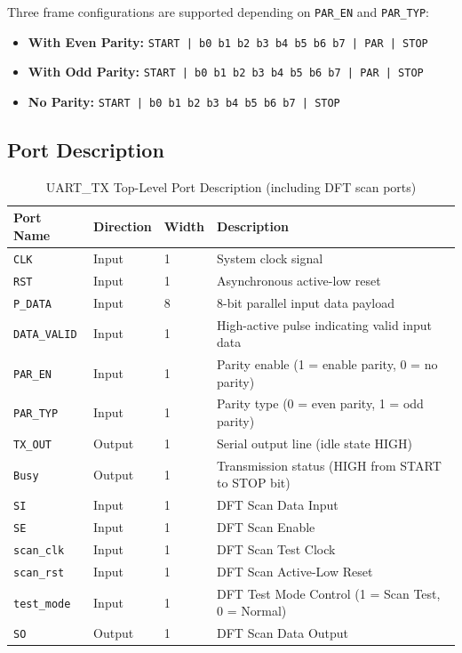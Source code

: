 \documentclass[12pt,a4paper]{article}
\begin{document}
Three frame configurations are supported depending on \texttt{PAR\_EN} and \texttt{PAR\_TYP}:
\begin{itemize}
  \item \textbf{With Even Parity:} \texttt{START | b0 b1 b2 b3 b4 b5 b6 b7 | PAR | STOP}
  \item \textbf{With Odd Parity:}  \texttt{START | b0 b1 b2 b3 b4 b5 b6 b7 | PAR | STOP}
  \item \textbf{No Parity:}        \texttt{START | b0 b1 b2 b3 b4 b5 b6 b7 | STOP}
\end{itemize}

\subsection{Port Description}

\begin{table}[H]
\centering
\small
\begin{tabular}{llll}
\toprule
\textbf{Port Name} & \textbf{Direction} & \textbf{Width} & \textbf{Description} \\
\midrule
\texttt{CLK}        & Input  & 1 & System clock signal \\
\texttt{RST}        & Input  & 1 & Asynchronous active-low reset \\
\texttt{P\_DATA}    & Input  & 8 & 8-bit parallel input data payload \\
\texttt{DATA\_VALID}& Input  & 1 & High-active pulse indicating valid input data \\
\texttt{PAR\_EN}    & Input  & 1 & Parity enable (1 = enable parity, 0 = no parity) \\
\texttt{PAR\_TYP}   & Input  & 1 & Parity type (0 = even parity, 1 = odd parity) \\
\texttt{TX\_OUT}    & Output & 1 & Serial output line (idle state HIGH) \\
\texttt{Busy}       & Output & 1 & Transmission status (HIGH from START to STOP bit) \\
\midrule
\texttt{SI}         & Input  & 1 & DFT Scan Data Input \\
\texttt{SE}         & Input  & 1 & DFT Scan Enable \\
\texttt{scan\_clk}  & Input  & 1 & DFT Scan Test Clock \\
\texttt{scan\_rst}  & Input  & 1 & DFT Scan Active-Low Reset \\
\texttt{test\_mode} & Input  & 1 & DFT Test Mode Control (1 = Scan Test, 0 = Normal) \\
\texttt{SO}         & Output & 1 & DFT Scan Data Output \\
\bottomrule
\end{tabular}
\caption{UART\_TX Top-Level Port Description (including DFT scan ports)}
\end{table}
\end{document}
